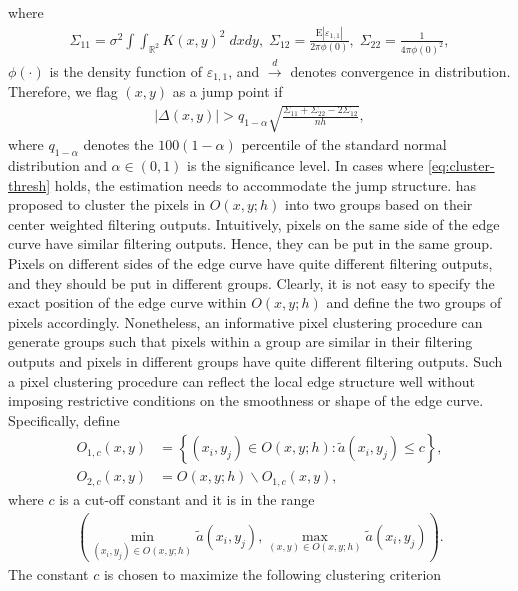 where
\begin{align*}
  \Sigma_{11} = \sigma^2 \int\int_{\mathbb{R}^2} K(x, y)^2 \; dxdy, \; \Sigma_{12} = \frac{\mathrm{E}|\varepsilon_{1, 1}|}{2\pi \phi(0)}, \; \Sigma_{22} = \frac{1}{4\pi \phi(0)^2},
\end{align*}
\(\phi(\cdot)\) is the density function of \(\varepsilon_{1, 1}\), and \(\stackrel{d}{\rightarrow}\) denotes convergence in distribution. Therefore, we flag \((x, y)\) as a jump point if
\begin{align}
  \label{eq:cluster-thresh}
  \left| \Delta(x, y) \right| > q_{1 - \alpha} \sqrt{\frac{\Sigma_{11} + \Sigma_{22} - 2\Sigma_{12}}{nh}},
\end{align}
where \(q_{1 - \alpha}\) denotes the \(100( 1- \alpha)\) percentile of the standard normal distribution and \(\alpha \in (0, 1)\) is the significance level. In cases where \eqref{eq:cluster-thresh} holds, the estimation needs to accommodate the jump structure. \citet{kang2018efficient} has proposed to cluster the pixels in \(O(x, y; h)\) into two groups based on their center weighted filtering outputs. Intuitively, pixels on the same side of the edge curve have similar filtering outputs. Hence, they can be put in the same group. Pixels on different sides of the edge curve have quite different filtering outputs, and they should be put in different groups. Clearly, it is not easy to specify the exact position of the edge curve within \(O(x, y; h)\) and define the two groups of pixels accordingly. Nonetheless, an informative pixel clustering procedure can generate groups such that pixels within a group are similar in their filtering outputs and pixels in different groups have quite different filtering outputs. Such a pixel clustering procedure can reflect the local edge structure well without imposing restrictive conditions on the smoothness or shape of the edge curve. Specifically, define
\begin{align*}
  O_{1, c}(x, y) &= \left\{ (x_i, y_j) \in O(x, y; h): \tilde{a}(x_i, y_j) \leq c \right\}, \\
  O_{2, c}(x, y) &= O(x, y; h) \backslash O_{1, c}(x, y), %
\end{align*}
where \(c\) is a cut-off constant and it is in the range
\begin{align*}
  \left(\min_{(x_i, y_j) \in O(x, y; h)} \tilde{a}(x_i, y_j), \max_{(x, y) \in O(x, y; h)} \tilde{a}(x_i, y_j) \right).
\end{align*}
The constant \(c\) is chosen to maximize the following clustering criterion
